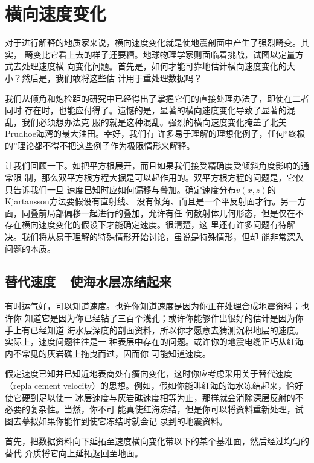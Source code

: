 \section{横向速度变化}
\label{sec:3.7}

对于进行解释的地质家来说，横向速度变化就是使地震剖面中产生了强烈畸变。其实，
畸变比它看上去的样子还要糟。地球物理学家则面临着挑战，试图以定量方式去处理速度横
向变化问题。首先是，如何才能可靠地估计横向速度变化的大小？然后是，我们敢将这些估
计用于重处理数据吗？

我们从倾角和炮检距的研究中已经得出了掌握它们的直接处理办法了，即使在二者同时
存在时，也能应付得了。遗憾的是，显著的横向速度变化导致了显著的混乱，我们必须想办法克
服的就是这种混乱。强烈的横向速度变化掩盖了北美Prudhoe海湾的最大油田。幸好，我们有
许多易于理解的理想化例子，任何“终极的”理论都不得不把这些例子作为极限情形来解释。

让我们回顾一下。如把平方根展开，而且如果我们接受精确度受倾斜角度影响的通常限
制，那么双平方根方程大掘是可以起作用的。双平方根方程的问题是，它仅只告诉我们一旦
速度已知时应如何偏移与叠加。确定速度分布$v(x,z)$的Kjartansson方法要假设有直射线、
没有倾角、而且是一个平反射面才行。另一方面，同叠前局部偏移一起进行的叠加，允许有任
何散射体几何形态，但是仅在不存在横向速度变化的假设下才能确定速度。很清楚，这
里还有许多问题有待解决。我们将从易于理解的特殊情形开始讨论，虽说是特殊情形，但却
能非常深入问题的本质。


\subsection{替代速度---使海水层冻结起来}
\label{sec:3.7.1}

有时运气好，可以知道速度。也许你知道速度是因为你正在处理合成地震资料；也许你
知道它是因为你已经钻了三百个浅孔；或许你能够作出很好的估计是因为你手上有已经知道
海水层深度的剖面资料，所以你才愿意去猜测沉积地层的速度。实际上，速度问题往往是一
种表层中存在的问题。或许你的地震电缆正巧从红海内不常见的灰岩礁上拖曳而过，因而你
可能知道速度。

假定速度已知并已知近地表商处有癀向变化，这时你应考虑采用关于替代速度（repla
cement velocity）的思想。例如，假如你能叫红海的海水冻结起来，恰好使它硬到足以使一
冰层速度与灰岩礁速度相等为止，那样就会消除深层反射的不必要的复杂性。当然，你不可
能真使红海冻结，但是你可以将资料重新处理，试图去摹拟如果你能作到使它冻结时就会记
录到的地震资料。

首先，把数据资料向下延拓至速度横向变化带以下的某个基准面，然后经过均匀的替代
介质将它向上延拓返回至地面。

